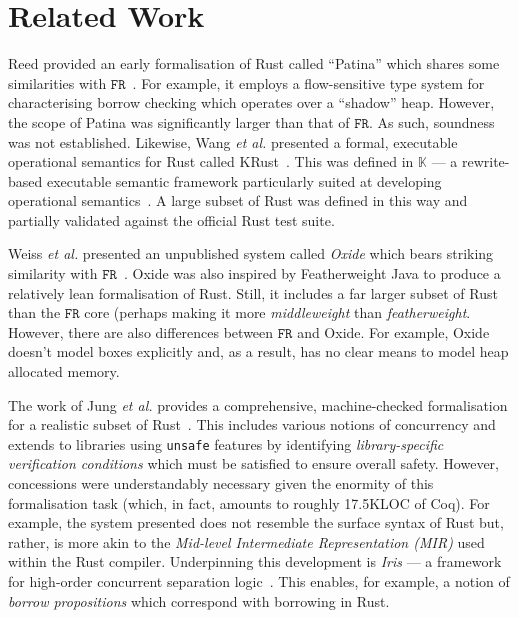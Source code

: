 \newcommand{\FR}{}
\def\FR/{$\mathtt{FR}$}


\section{Related Work}


Reed provided an early formalisation of Rust called ``Patina'' which
shares some similarities with \FR/~\cite{Reed15}.  For example, it
employs a flow-sensitive type system for characterising borrow
checking which operates over a ``shadow'' heap.  However, the scope of
Patina was significantly larger than that of \FR/.  As such, soundness
was not established.  Likewise, Wang {\em et al.} presented a formal,
executable operational semantics for Rust called KRust~\cite{WSZZZ18}.
This was defined in $\mathbb{K}$ --- a rewrite-based executable
semantic framework particularly suited at developing operational
semantics~\cite{RS10b}.  A large subset of Rust was defined in this
way and partially validated against the official Rust test suite.

Weiss {\em et al.} presented an unpublished system called {\em Oxide}
which bears striking similarity with \FR/~\cite{WPMA19}.  Oxide was
also inspired by Featherweight Java to produce a relatively lean
formalisation of Rust.  Still, it includes a far larger subset of Rust
than the \FR/ core (perhaps making it more {\em middleweight} than
{\em featherweight}.  However, there are also differences between \FR/
and Oxide.  For example, Oxide doesn't model boxes explicitly and, as
a result, has no clear means to model heap allocated memory.

The work of Jung {\em et al.} provides a comprehensive,
machine-checked formalisation for a realistic subset of
Rust~\cite{JJKD18}.  This includes various notions of concurrency and
extends to libraries using \lstinline{unsafe} features by identifying
{\em library-specific verification conditions} which must be satisfied
to ensure overall safety.  However, concessions were understandably
necessary given the enormity of this formalisation task (which, in
fact, amounts to roughly 17.5KLOC of Coq).  For example, the system
presented does not resemble the surface syntax of Rust but, rather, is
more akin to the {\em Mid-level Intermediate Representation (MIR)}
used within the Rust compiler.  Underpinning this development is {\em
  Iris} --- a framework for high-order concurrent separation
logic~\cite{JKBD16,KDDLV17,JKJBBD18}.  This enables, for example, a
notion of {\em borrow propositions} which correspond with borrowing in
Rust.



